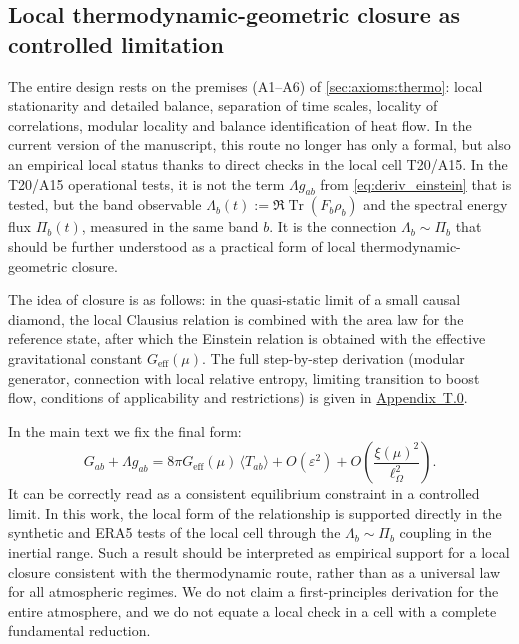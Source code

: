 \documentclass[11pt,a4paper]{article}
\DeclareMathOperator{\Tr}{Tr}
\theoremstyle{definition}
\theoremstyle{plain}
\theoremstyle{remark}
\begin{document}
\subsection{Local thermodynamic-geometric closure as controlled limitation}
\label{sec:derivations:gr}

The entire design rests on the premises (A1--A6) of \cref{sec:axioms:thermo}: local stationarity and detailed balance, separation of time scales, locality of correlations, modular locality and balance identification of heat flow. In the current version of the manuscript, this route no longer has only a formal, but also an empirical local status thanks to direct checks in the local cell T20/A15. In the T20/A15 operational tests, it is not the term $\Lambda g_{ab}$ from \cref{eq:deriv_einstein} that is tested, but the band observable
\(\Lambda_b(t):=\Re\Tr(F_b\rho_b)\) and the spectral energy flux \(\Pi_b(t)\), measured in the same band \(b\).
It is the connection \(\Lambda_b\sim\Pi_b\) that should be further understood as a practical form of local thermodynamic-geometric closure.

The idea of closure is as follows: in the quasi-static limit of a small causal diamond, the local Clausius relation is combined with the area law for the reference state, after which the Einstein relation is obtained with the effective gravitational constant $G_{\mathrm{eff}}(\mu)$. The full step-by-step derivation (modular generator, connection with local relative entropy, limiting transition to boost flow, conditions of applicability and restrictions) is given in \hyperref[sec:appendix:einstein_full]{Appendix~T.0}.

In the main text we fix the final form:
\begin{equation}\label{eq:deriv_einstein}
G_{ab}+\Lambda g_{ab}
=
8\pi G_{\mathrm{eff}}(\mu)\,\langle T_{ab}\rangle
+
O(\varepsilon^2)
+
O\!\left(\frac{\xi(\mu)^2}{\ell_\Omega^2}\right).
\end{equation}
It can be correctly read as a consistent equilibrium constraint in a controlled limit. In this work, the local form of the relationship is supported directly in the synthetic and ERA5 tests of the local cell through the $\Lambda_b\sim\Pi_b$ coupling in the inertial range. Such a result should be interpreted as empirical support for a local closure consistent with the thermodynamic route, rather than as a universal law for all atmospheric regimes. We do not claim a first-principles derivation for the entire atmosphere, and we do not equate a local check in a cell with a complete fundamental reduction.
\end{document}
